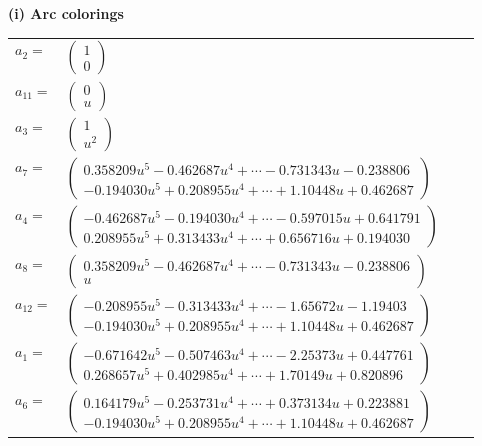 \documentclass[1p]{elsarticle_modified}
\theoremstyle{definition}
\begin{document}
\flushleft \textbf{(i) Arc colorings}\\
\begin{tabular}{m{7pt} m{180pt} m{7pt} m{180pt} }
\flushright $a_{2}=$&$\begin{pmatrix}1\\0\end{pmatrix}$ \\
\flushright $a_{11}=$&$\begin{pmatrix}0\\u\end{pmatrix}$ \\
\flushright $a_{3}=$&$\begin{pmatrix}1\\u^2\end{pmatrix}$ \\
\flushright $a_{7}=$&$\begin{pmatrix}0.358209 u^{5}-0.462687 u^{4}+\cdots-0.731343 u-0.238806\\-0.194030 u^{5}+0.208955 u^{4}+\cdots+1.10448 u+0.462687\end{pmatrix}$ \\
\flushright $a_{4}=$&$\begin{pmatrix}-0.462687 u^{5}-0.194030 u^{4}+\cdots-0.597015 u+0.641791\\0.208955 u^{5}+0.313433 u^{4}+\cdots+0.656716 u+0.194030\end{pmatrix}$ \\
\flushright $a_{8}=$&$\begin{pmatrix}0.358209 u^{5}-0.462687 u^{4}+\cdots-0.731343 u-0.238806\\u\end{pmatrix}$ \\
\flushright $a_{12}=$&$\begin{pmatrix}-0.208955 u^{5}-0.313433 u^{4}+\cdots-1.65672 u-1.19403\\-0.194030 u^{5}+0.208955 u^{4}+\cdots+1.10448 u+0.462687\end{pmatrix}$ \\
\flushright $a_{1}=$&$\begin{pmatrix}-0.671642 u^{5}-0.507463 u^{4}+\cdots-2.25373 u+0.447761\\0.268657 u^{5}+0.402985 u^{4}+\cdots+1.70149 u+0.820896\end{pmatrix}$ \\
\flushright $a_{6}=$&$\begin{pmatrix}0.164179 u^{5}-0.253731 u^{4}+\cdots+0.373134 u+0.223881\\-0.194030 u^{5}+0.208955 u^{4}+\cdots+1.10448 u+0.462687\end{pmatrix}$ \\

\end{tabular}
\end{document}
